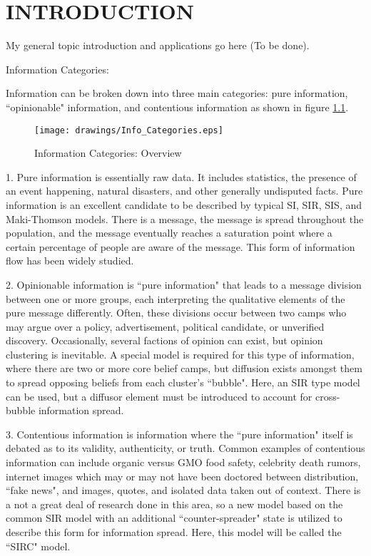 \chapter{INTRODUCTION}%


My general topic introduction and applications go here (To be done).




\noindent Information Categories:

Information can be broken down into three main categories: pure information, ``opinionable" information, and contentious information as shown in figure \ref{fig:Info_Categories}.


\begin{figure}[!htbp] \centering
  \texttt{[image: drawings/Info\_Categories.eps]}
  \caption{Information Categories: Overview}
  \label{fig:Info_Categories}
\end{figure}

1. Pure information is essentially raw data. It includes statistics, the presence of an event happening, natural disasters, and other generally undisputed facts. Pure information is an excellent candidate to be described by typical SI, SIR, SIS, and Maki-Thomson models. There is a message, the message is spread throughout the population, and the message eventually reaches a saturation point where a certain percentage of people are aware of the message. This form of information flow has been widely studied.

2. Opinionable information is ``pure information" that leads to a message division between one or more groups, each interpreting the qualitative elements of the pure message differently. Often, these divisions occur between two camps who may argue over a policy, advertisement, political candidate, or unverified discovery. Occasionally, several factions of opinion can exist, but opinion clustering is inevitable. A special model is required for this type of information, where there are two or more core belief camps, but diffusion exists amongst them to spread opposing beliefs from each cluster's ``bubble". Here, an SIR type model can be used, but a diffusor element must be introduced to account for cross-bubble information spread.

3. Contentious information is information where the ``pure information" itself is debated as to its validity, authenticity, or truth. Common examples of contentious information can include organic versus GMO food safety, celebrity death rumors, internet images which may or may not have been doctored between distribution, ``fake news", and images, quotes, and isolated data taken out of context. There is a not a great deal of research done in this area, so a new model based on the common SIR model with an additional ``counter-spreader" state is utilized to describe this form for information spread. Here, this model will be called the ``SIRC" model.



